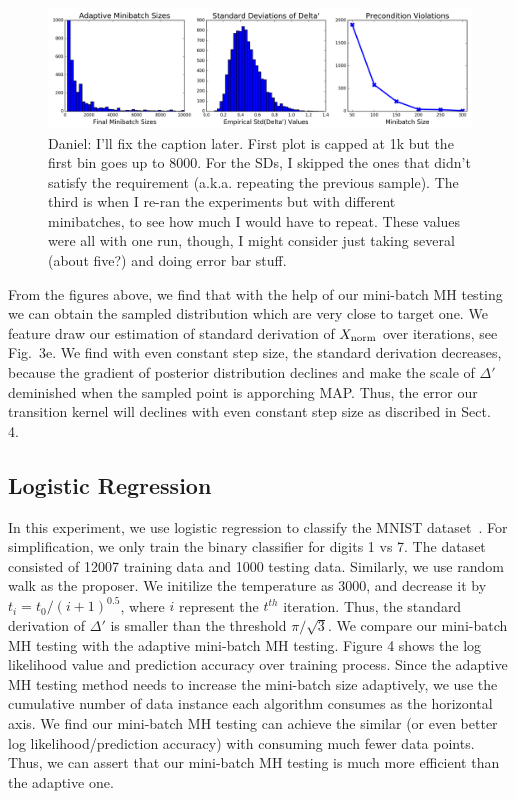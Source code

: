 \documentclass{article}
\begin{document}
\begin{figure}[t]
    \centering
    \includegraphics[width=1\linewidth]{adaptive_and_ours_information_v01.png}
    \caption{
    {\color{blue}
    Daniel: I'll fix the caption later. First plot is capped at 1k but the first bin goes up to
    8000. For the SDs, I skipped the ones that didn't satisfy the requirement (a.k.a. repeating the
    previous sample). The third is when I re-ran the experiments but with different minibatches, to
    see how much I would have to repeat. These values were all with one run, though, I might
    consider just taking several (about five?) and doing error bar stuff.
    }
    }
\end{figure}

From the figures above, we find that with the help of our mini-batch MH testing we can obtain the
sampled distribution which are very close to target one. We feature draw our estimation of standard
derivation of $X_{\rm norm}$ over iterations, see Fig.~3e. We find with even constant step size, the
standard derivation decreases, because the gradient of posterior distribution declines and make the
scale of $\Delta'$ deminished when the sampled point is apporching MAP. Thus, the error our
transition kernel will declines with even constant step size as discribed in Sect.~ 4.

\subsection{Logistic Regression}\label{ssec:logistic}

In this experiment, we use logistic regression to classify the MNIST
dataset~\cite{lecun-mnisthandwrittendigit-2010}. For simplification, we only train the binary
classifier for digits 1 vs 7. The dataset consisted of 12007 training data and 1000 testing data.
Similarly, we use random walk as the proposer. We initilize the temperature as 3000, and decrease it by $t_i = t_0 / (i + 1)^{0.5}$, where $i$ represent the $t^{th}$ iteration. Thus, the standard derivation of $\Delta'$ is smaller than the threshold $\pi/\sqrt{3}$.  We compare our mini-batch MH testing with the
adaptive mini-batch MH testing. Figure 4 shows the log likelihood value and prediction accuracy over
training process. Since the adaptive MH testing method needs to increase the mini-batch size
adaptively, we use the cumulative number of data instance each algorithm consumes as the horizontal
axis. We find our mini-batch MH testing can achieve the similar (or even better log
likelihood/prediction accuracy) with consuming much fewer data points. Thus, we can assert that our
mini-batch MH testing is much more efficient than the adaptive one. 
\end{document}
